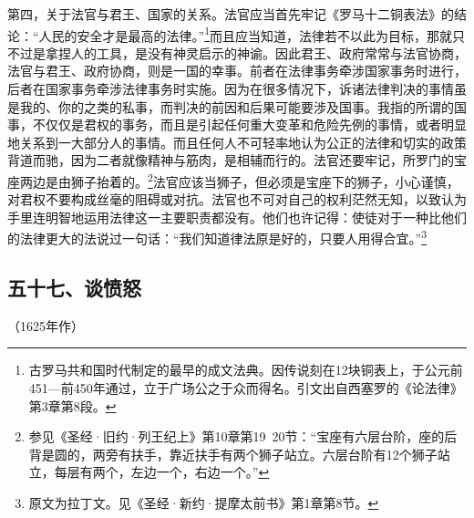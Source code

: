 \par 第四，关于法官与君王、国家的关系。法官应当首先牢记《罗马十二铜表法》的结论：“人民的安全才是最高的法律。”\footnote{古罗马共和国时代制定的最早的成文法典。因传说刻在12块铜表上，于公元前451—前450年通过，立于广场公之于众而得名。引文出自西塞罗的《论法律》第3章第8段。}而且应当知道，法律若不以此为目标，那就只不过是拿捏人的工具，是没有神灵启示的神谕。因此君王、政府常常与法官协商，法官与君王、政府协商，则是一国的幸事。前者在法律事务牵涉国家事务时进行，后者在国家事务牵涉法律事务时实施。因为在很多情况下，诉诸法律判决的事情虽是我的、你的之类的私事，而判决的前因和后果可能要涉及国事。我指的所谓的国事，不仅仅是君权的事务，而且是引起任何重大变革和危险先例的事情，或者明显地关系到一大部分人的事情。而且任何人不可轻率地认为公正的法律和切实的政策背道而驰，因为二者就像精神与筋肉，是相辅而行的。法官还要牢记，所罗门的宝座两边是由狮子抬着的。\footnote{参见《圣经·旧约·列王纪上》第10章第19~20节：“宝座有六层台阶，座的后背是圆的，两旁有扶手，靠近扶手有两个狮子站立。六层台阶有12个狮子站立，每层有两个，左边一个，右边一个。”}法官应该当狮子，但必须是宝座下的狮子，小心谨慎，对君权不要构成丝毫的阻碍或对抗。法官也不可对自己的权利茫然无知，以致认为手里连明智地运用法律这一主要职责都没有。他们也许记得：使徒对于一种比他们的法律更大的法说过一句话：“我们知道律法原是好的，只要人用得合宜。”\footnote{原文为拉丁文。见《圣经·新约·提摩太前书》第1章第8节。}



\subsection*{五十七、谈愤怒}
\begin{center}
    （1625年作）
\end{center}

